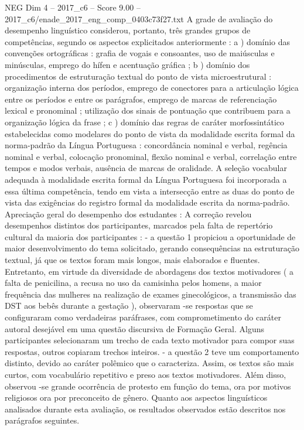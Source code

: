 \begin{textsample}{NEG Dim 4 – 2017\_c6 – Score 9.00 – 2017\_c6/enade\_2017\_eng\_comp\_0403c73f27.txt}
A grade de avaliação do desempenho linguístico considerou, portanto, três grandes grupos de competências, segundo os aspectos explicitados anteriormente : a ) domínio das convenções ortográficas : grafia de vogais e consoantes, uso de maiúsculas e minúsculas, emprego do hífen e acentuação gráfica ; b ) domínio dos procedimentos de estruturação textual do ponto de vista microestrutural : organização interna dos períodos, emprego de conectores para a articulação lógica entre os períodos e entre os parágrafos, emprego de marcas de referenciação lexical e pronominal ; utilização dos sinais de pontuação que contribuem para a organização lógica da frase ; c ) domínio das regras de caráter morfossintático estabelecidas como modelares do ponto de vista da modalidade escrita formal da norma-padrão da Língua Portuguesa : concordância nominal e verbal, regência nominal e verbal, colocação pronominal, flexão nominal e verbal, correlação entre tempos e modos verbais, ausência de marcas de oralidade.
A seleção vocabular adequada à modalidade escrita formal da Língua Portuguesa foi incorporada a essa última competência, tendo em vista a intersecção entre as duas do ponto de vista das exigências do registro formal da modalidade escrita da norma-padrão.
Apreciação geral do desempenho dos estudantes : A correção revelou desempenhos distintos dos participantes, marcados pela falta de repertório cultural da maioria dos participantes : - a questão 1 propiciou a oportunidade de maior desenvolvimento do tema solicitado, gerando consequências na estruturação textual, já que os textos foram mais longos, mais elaborados e fluentes.
Entretanto, em virtude da diversidade de abordagens dos textos motivadores ( a falta de penicilina, a recusa no uso da camisinha pelos homens, a maior frequência das mulheres na realização de exames ginecológicos, a transmissão das DST aos bebês durante a gestação ), observaram -se respostas que se configuraram como verdadeiras paráfrases, com comprometimento do caráter autoral desejável em uma questão discursiva de Formação Geral.
Alguns participantes selecionaram um trecho de cada texto motivador para compor suas respostas, outros copiaram trechos inteiros. - a questão 2 teve um comportamento distinto, devido ao caráter polêmico que o caracteriza.
Assim, os textos são mais curtos, com vocabulário repetitivo e preso aos textos motivadores.
Além disso, observou -se grande ocorrência de protesto em função do tema, ora por motivos religiosos ora por preconceito de gênero.
Quanto aos aspectos linguísticos analisados durante esta avaliação, os resultados observados estão descritos nos parágrafos seguintes.

\end{textsample}
